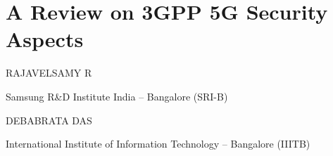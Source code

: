 \chapter{A Review on 3GPP 5G Security Aspects}

\begin{center}
{\large\uppercase{Rajavelsamy R}} 

\vskip -6pt

Samsung R\&D Institute India – Bangalore (SRI-B)

\bigskip
{\large\uppercase{Debabrata Das}} 

\vskip -6pt

International Institute of Information Technology – Bangalore (IIITB)
\end{center}

\noindent{}

\newpage

